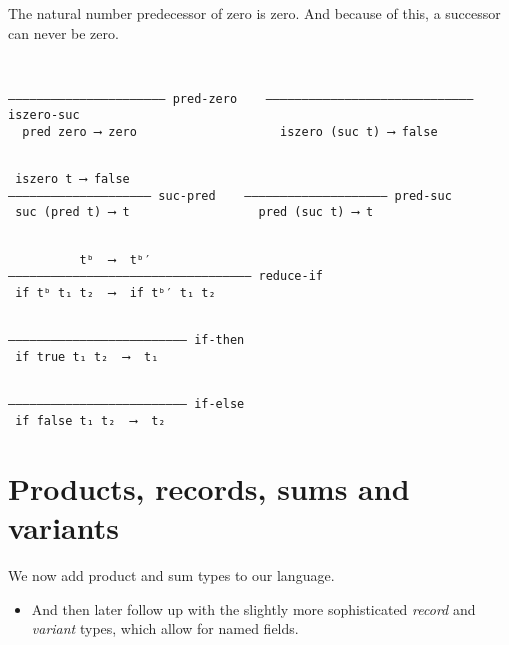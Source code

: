 \documentclass[11pt]{article}
\theoremstyle{definition}
\begin{document}
The natural number predecessor of zero is zero.
And because of this, a successor can never be zero.
\begin{verbatim}

                                              
–––––––––––––––––––––– pred-zero    ––––––––––––––––––––––––––––– iszero-suc
  pred zero ⟶ zero                    iszero (suc t) ⟶ false                                           

\end{verbatim}

\begin{verbatim}

 iszero t ⟶ false
–––––––––––––––––––– suc-pred    –––––––––––––––––––– pred-suc
 suc (pred t) ⟶ t                  pred (suc t) ⟶ t                                           

\end{verbatim}

\iffalse

\subsection{Semantics of natural numbers and booleans continued}
\label{sec:org981d7f5}

\fi

\begin{verbatim}

          tᵇ  ⟶  tᵇ′
–––––––––––––––––––––––––––––––––– reduce-if
 if tᵇ t₁ t₂  ⟶  if tᵇ′ t₁ t₂

\end{verbatim}

\begin{verbatim}

––––––––––––––––––––––––– if-then
 if true t₁ t₂  ⟶  t₁

\end{verbatim}

\begin{verbatim}

––––––––––––––––––––––––– if-else
 if false t₁ t₂  ⟶  t₂
\end{verbatim}

\section{Products, records, sums and variants}
\label{sec:orga8b5023}

We now add product and sum types to our language.
\begin{itemize}
\item And then later follow up with the slightly more sophisticated \emph{record}
and \emph{variant} types, which allow for named fields.
\end{itemize}
\end{document}
